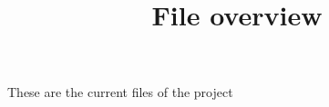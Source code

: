 \documentclass[11pt]{article}
\title{File overview}
\begin{document}
\maketitle
These are the current files of the project

\textbf{}
\end{document}
